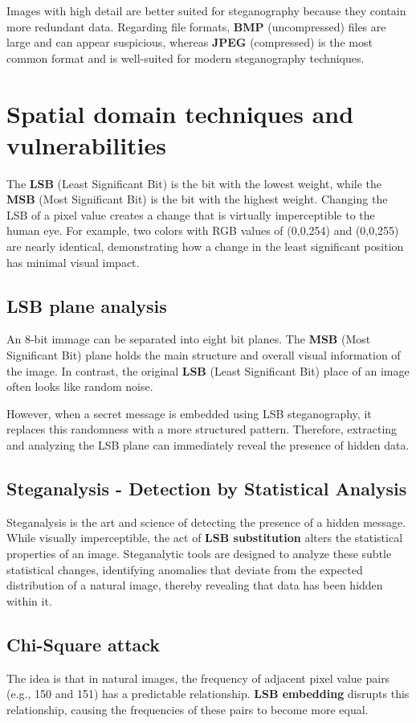    Images with high detail are better suited for steganography because they
    contain more redundant data. Regarding file formats, \textbf{BMP}
    (uncompressed) files are large and can appear suspicious, whereas
    \textbf{JPEG} (compressed) is the most common format and is well-suited for
    modern steganography techniques.
\section{Spatial domain techniques and vulnerabilities}
    The \textbf{LSB} (Least Significant Bit) is the bit with the lowest weight,
    while the \textbf{MSB} (Most Significant Bit) is the bit with the highest
    weight. Changing the LSB of a pixel value creates a change that is virtually
    imperceptible to the human eye. For example, two colors with RGB values of
    (0,0,254) and (0,0,255) are nearly identical, demonstrating how a change in
    the least significant position has minimal visual impact.
    \subsection{LSB plane analysis}
        An 8-bit immage can be separated into eight bit planes. The \textbf{MSB}
        (Most Significant Bit) plane holds the main structure and overall visual
        information of the image. In contrast, the original \textbf{LSB}
        (Least Significant Bit) place of an image often looks like random noise.
        
        However, when a secret message is embedded using LSB steganography, it
        replaces this randomness with a more structured pattern. Therefore,
        extracting and analyzing the LSB plane can immediately reveal the
        presence of hidden data.
    \subsection{Steganalysis - Detection by Statistical Analysis}
        Steganalysis is the art and science of detecting the presence of a
        hidden message. While visually imperceptible, the act of \textbf{LSB
        substitution} alters the statistical properties of an image.
        Steganalytic tools are designed to analyze these subtle statistical
        changes, identifying anomalies that deviate from the expected
        distribution of a natural image, thereby revealing that data has been
        hidden within it.
    \subsection{Chi-Square attack}
        The idea is that in natural images, the frequency of adjacent pixel
        value pairs (e.g., 150 and 151) has a predictable relationship.
        \textbf{LSB embedding} disrupts this relationship, causing the
        frequencies of these pairs to become more equal.\\
        
